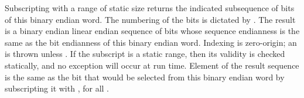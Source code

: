 
Subscripting with a range of static size  returns the indicated subsequence of bits
of this binary endian word.
The numbering of the bits is dictated by .
The result is a binary endian linear endian sequence of bits whose sequence endianness
is the same as the bit endianness of this binary endian word.
Indexing is zero-origin;
an  is thrown unless .
If the subscript is a static range, then its validity is checked statically,
and no exception will occur at run time.
Element  of the result sequence is the same as
the bit that would be selected from this binary endian word by subscripting it with
, for all .



